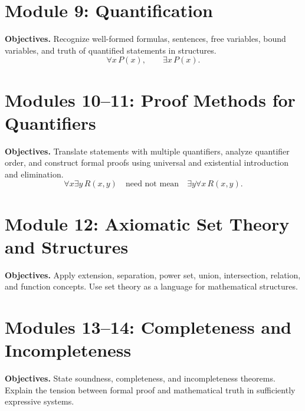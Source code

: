 \documentclass[11pt]{article}
\begin{document}
\section{Module 9: Quantification}
\textbf{Objectives.} Recognize well-formed formulas, sentences, free variables, bound variables, and truth of quantified statements in structures.
\[
\forall x\,P(x), \qquad \exists x\,P(x).
\]

\section{Modules 10--11: Proof Methods for Quantifiers}
\textbf{Objectives.} Translate statements with multiple quantifiers, analyze quantifier order, and construct formal proofs using universal and existential introduction and elimination.
\[
\forall x\exists y\,R(x,y) \quad \text{need not mean} \quad \exists y\forall x\,R(x,y).
\]

\section{Module 12: Axiomatic Set Theory and Structures}
\textbf{Objectives.} Apply extension, separation, power set, union, intersection, relation, and function concepts. Use set theory as a language for mathematical structures.

\section{Modules 13--14: Completeness and Incompleteness}
\textbf{Objectives.} State soundness, completeness, and incompleteness theorems. Explain the tension between formal proof and mathematical truth in sufficiently expressive systems.
\end{document}
